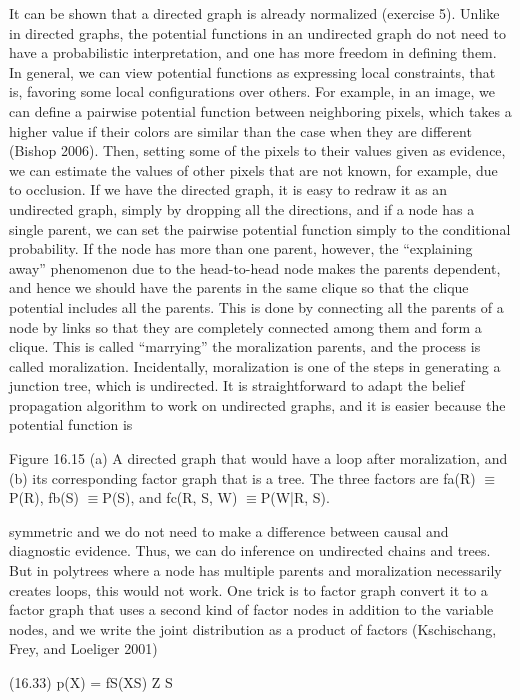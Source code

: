 It can be shown that a directed graph is already normalized (exercise 5). Unlike in directed graphs, the potential functions in an undirected graph do not need to have a probabilistic interpretation, and one has more freedom in defining them. In general, we can view potential functions as expressing local constraints, that is, favoring some local configurations over others. For example, in an image, we can define a pairwise potential function between neighboring pixels, which takes a higher value if their colors are similar than the case when they are different (Bishop 2006). Then, setting some of the pixels to their values given as evidence, we can estimate the values of other pixels that are not known, for example, due to occlusion. If we have the directed graph, it is easy to redraw it as an undirected graph, simply by dropping all the directions, and if a node has a single parent, we can set the pairwise potential function simply to the conditional probability. If the node has more than one parent, however, the “explaining away” phenomenon due to the head-to-head node makes the parents dependent, and hence we should have the parents in the same clique so that the clique potential includes all the parents. This is done by connecting all the parents of a node by links so that they are completely connected among them and form a clique. This is called “marrying” the moralization parents, and the process is called moralization. Incidentally, moralization is one of the steps in generating a junction tree, which is undirected. It is straightforward to adapt the belief propagation algorithm to work on undirected graphs, and it is easier because the potential function is

Figure 16.15 (a) A directed graph that would have a loop after moralization, and (b) its corresponding factor graph that is a tree. The three factors are fa(R) $\equiv$ P(R), fb(S) $\equiv$P(S), and fc(R, S, W) $\equiv$P(W|R, S).

symmetric and we do not need to make a difference between causal and diagnostic evidence. Thus, we can do inference on undirected chains and trees. But in polytrees where a node has multiple parents and moralization necessarily creates loops, this would not work. One trick is to factor graph convert it to a factor graph that uses a second kind of factor nodes in addition to the variable nodes, and we write the joint distribution as a product of factors (Kschischang, Frey, and Loeliger 2001)

(16.33) p(X) = fS(XS) Z S

